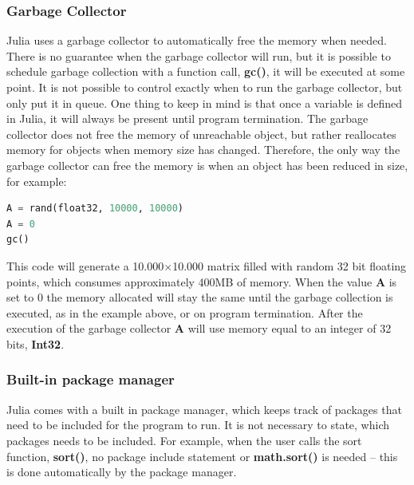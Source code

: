 \documentclass[a4paper, 11pt, titlepage]{article}
\begin{document}
\subsubsection{Garbage Collector}
Julia uses a garbage collector to automatically free the memory when needed. There is no guarantee when the garbage collector will run, but it is possible to schedule garbage collection with a function call, \textbf{gc()}, it will be executed at some point. It is not possible to control exactly when to run the garbage collector, but only put it in queue. One thing to keep in mind is that once a variable is defined in Julia, it will always be present until program termination. The garbage collector does not free the memory of unreachable object, but rather reallocates memory for objects when memory size has changed. Therefore, the only way the garbage collector can free the memory is when an object has been reduced in size, for example:

\begin{lstlisting}[language=python]
A = rand(float32, 10000, 10000) 
A = 0
gc() 
\end{lstlisting}
This code will generate a 10.000$\times$10.000 matrix filled with random 32 bit floating points, which consumes approximately 400MB of memory. When the value \textbf{A} is set to 0 the memory allocated will stay the same until the garbage collection is executed, as in the example above, or on program termination. After the execution of the garbage collector \textbf{A} will use memory equal to an integer of 32 bits, \textbf{Int32}.

\subsubsection{Built-in package manager}
Julia comes with a built in package manager, which keeps track of packages that need to be included for the program to run. It is not necessary to state, which packages needs to be included. For example, when the user calls the sort function, \textbf{sort()}, no package include statement or \textbf{math.sort()} is needed – this is done automatically by the package manager.
\end{document}
